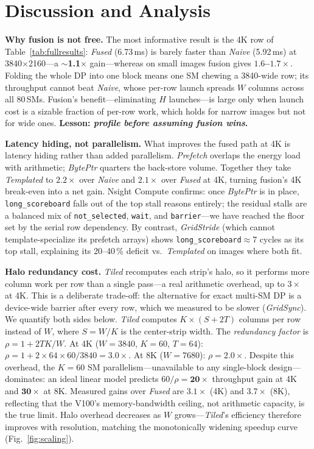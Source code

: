 \section{Discussion and Analysis}
\label{sec:disc}
\textbf{Why fusion is not free.} The most informative result is the 4K row of
Table~\ref{tab:fullresults}: \emph{Fused} (6.73\,ms) is barely faster than \emph{Naive}
(5.92\,ms) at 3840$\times$2160---a \textbf{$\sim$1.1$\times$} gain---whereas on small images
fusion gives \textbf{$1.6$--$1.7\times$}. Folding the whole DP into one block means one SM
chewing a 3840-wide row; its throughput cannot beat \emph{Naive}, whose per-row
launch spreads $W$ columns across all 80\,SMs. Fusion's benefit---eliminating $H$
launches---is large only when launch cost is a sizable fraction of per-row work,
which holds for narrow images but not for wide ones.
\textbf{Lesson: \emph{profile before assuming fusion wins}.}

\textbf{Latency hiding, not parallelism.} What improves the fused path at 4K is
latency hiding rather than added parallelism. \emph{Prefetch} overlaps the energy
load with arithmetic; \emph{BytePtr} quarters the back-store volume. Together
they take \emph{Templated} to $2.2\times$ over \emph{Naive} and $2.1\times$ over
\emph{Fused} at 4K, turning fusion's 4K break-even into a net gain.
Nsight Compute confirms: once \emph{BytePtr} is in place, \texttt{long\_scoreboard}
falls out of the top stall reasons entirely; the residual stalls are a balanced
mix of \texttt{not\_selected}, \texttt{wait}, and \texttt{barrier}---we have
reached the floor set by the serial row dependency.
By contrast, \emph{GridStride} (which cannot template-specialize its prefetch
arrays) shows \texttt{long\_scoreboard}$\approx$7 cycles as its top stall,
explaining its 20--40\,\% deficit vs.\ \emph{Templated} on images where both fit.

\textbf{Halo redundancy cost.}
\emph{Tiled} recomputes each strip's halo, so it performs more column work per
row than a single pass---a real arithmetic overhead, up to $3\times$ at 4K.
This is a deliberate trade-off: the alternative for exact multi-SM DP is a
device-wide barrier after every row, which we measured to be slower
(\emph{GridSync}). We quantify both sides below.
\emph{Tiled} computes $K{\times}(S{+}2T)$ columns per row instead of $W$,
where $S{=}W/K$ is the center-strip width. The \emph{redundancy factor} is
$\rho = 1 + 2TK/W$. At 4K ($W{=}3840$, $K{=}60$, $T{=}64$):
$\rho = 1 + 2{\times}64{\times}60/3840 = \mathbf{3.0{\times}}$.
At 8K ($W{=}7680$): $\rho = \mathbf{2.0{\times}}$.
Despite this overhead, the $K{=}60$ SM parallelism---unavailable to any
single-block design---dominates: an ideal linear model predicts
$60/\rho = \mathbf{20{\times}}$ throughput gain at 4K and $\mathbf{30{\times}}$ at 8K.
Measured gains over \emph{Fused} are \textbf{$3.1\times$} (4K) and \textbf{$3.7\times$} (8K),
reflecting that the V100's memory-bandwidth ceiling, not arithmetic capacity,
is the true limit. Halo overhead decreases as $W$ grows---\emph{Tiled}'s
efficiency therefore improves with resolution, matching the monotonically
widening speedup curve (Fig.~\ref{fig:scaling}).

